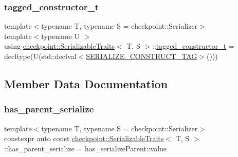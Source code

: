 \subsubsection{\texorpdfstring{tagged\+\_\+constructor\+\_\+t}{tagged\_constructor\_t}}
{\footnotesize\ttfamily template$<$typename T, typename S = checkpoint\+::\+Serializer$>$ \\
template$<$typename U $>$ \\
using \hyperlink{structcheckpoint_1_1_serializable_traits}{checkpoint\+::\+Serializable\+Traits}$<$ T, S $>$\+::\hyperlink{structcheckpoint_1_1_serializable_traits_a5a1f289a5008468335f22e288a96d861}{tagged\+\_\+constructor\+\_\+t} =  decltype(U(std\+::declval$<$\hyperlink{namespacecheckpoint_a7ff642cff4d72d01a16ab10e9bc363ef}{S\+E\+R\+I\+A\+L\+I\+Z\+E\+\_\+\+C\+O\+N\+S\+T\+R\+U\+C\+T\+\_\+\+T\+AG}$>$()))}



\subsection{Member Data Documentation}
\mbox{\label{structcheckpoint_1_1_serializable_traits_a122e712dd9adffac78f239a7c30b0a8f}} 
\subsubsection{\texorpdfstring{has\+\_\+parent\+\_\+serialize}{has\_parent\_serialize}}
{\footnotesize\ttfamily template$<$typename T, typename S = checkpoint\+::\+Serializer$>$ \\
constexpr auto const \hyperlink{structcheckpoint_1_1_serializable_traits}{checkpoint\+::\+Serializable\+Traits}$<$ T, S $>$\+::has\+\_\+parent\+\_\+serialize = has\+\_\+serialize\+Parent\+::value\hspace{0.3cm}{\ttfamily [static]}}

\mbox{\label{structcheckpoint_1_1_serializable_traits_a4d17a7627a8e033cccb5cf4e6b8fd0dc}} 

